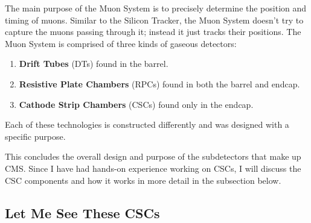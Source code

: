 The main purpose of the Muon System is to precisely determine the position and timing of muons.
Similar to the Silicon Tracker, the Muon System doesn't try to capture the muons passing through it;
instead it just tracks their positions. 
The Muon System is comprised of three kinds of gaseous detectors: 
\begin{enumerate}
    \item {\bf Drift Tubes} (DTs) found in the barrel.
    \item {\bf Resistive Plate Chambers} (RPCs) found in both the barrel and endcap.
    \item {\bf Cathode Strip Chambers} (CSCs) found only in the endcap.
\end{enumerate}
Each of these technologies is constructed differently and was designed with a specific purpose. 

This concludes the overall design and purpose of the subdetectors that make up CMS.
Since I have had hands-on experience working on CSCs, I will discuss the CSC components and how it works in more detail in the subsection below.


\subsection{Let Me See These CSCs}

